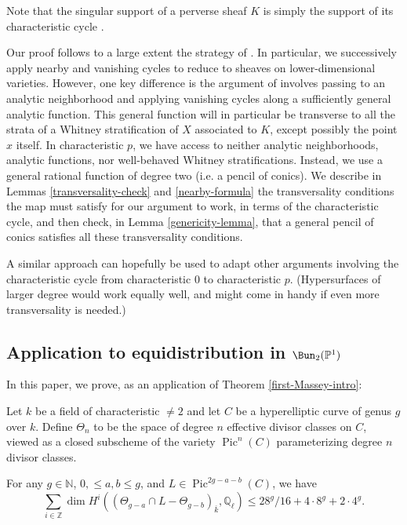Note that the singular support of a perverse sheaf $K$ is simply the support of its characteristic cycle \cite[Proposiiton 5.14(2)]{saito1}.

Our proof follows to a large extent the strategy of \citep{Massey}. In particular, we successively apply nearby and vanishing cycles to reduce to sheaves on lower-dimensional varieties. However, one key difference is the argument of \citep{Massey} involves passing to an analytic neighborhood and applying vanishing cycles along a sufficiently general analytic function. This general function will in particular be transverse to all the strata of a Whitney stratification of $X$ associated to $K$, except possibly the point $x$ itself. In characteristic $p$, we have access to neither analytic neighborhoods, analytic functions, nor well-behaved Whitney stratifications. Instead, we use a general rational function of degree two (i.e. a pencil of conics). We describe in Lemmas \ref{transversality-check} and \ref{nearby-formula} the transversality conditions the map must satisfy for our argument to work, in terms of the characteristic cycle, and then check, in Lemma \ref{genericity-lemma}, that a general pencil of conics satisfies all these transversality conditions.

A similar approach can hopefully be used to adapt other arguments involving the characteristic cycle from characteristic $0$ to characteristic $p$.  (Hypersurfaces of larger degree would work equally well, and might come in handy if even more transversality is needed.)



\subsection{Application to equidistribution in $\Bun_2(\mathbb P^1)$}

In this paper, we prove, as an application of Theorem \ref{first-Massey-intro}:

Let $k$ be a field of characteristic $\neq 2$ and let $C$ be a hyperelliptic curve of genus $g$ over $k$. Define $\Theta_n$ to be the space of degree $n$ effective divisor classes on $C$, viewed as a closed subscheme of the variety $\operatorname{Pic}^n(C)$ parameterizing degree $n$ divisor classes.

\begin{theorem}
\notready\label{theta-betti-bound} For any $g \in \mathbb N$, $0,\leq a,b \leq g$, and $L \in \operatorname{Pic}^{2g-a-b} (C)$, we have \[ \sum_{i \in \mathbb Z} \dim  H^i (  (\Theta_{g-a} \cap L - \Theta_{g-b} )_{\overline{k}}, \mathbb Q_\ell) \leq 28^g/16 + 4\cdot 8^g + 2\cdot 4^g. \]  \end{theorem}

